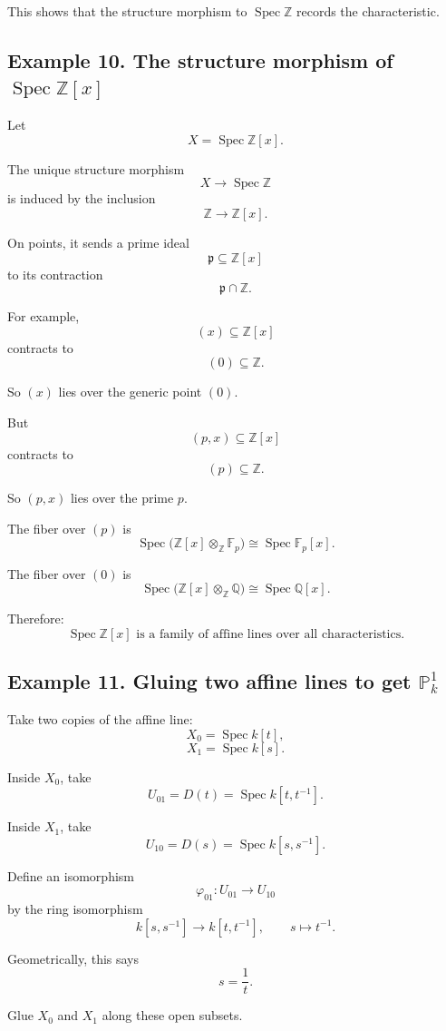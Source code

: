 \documentclass[12pt,a4paper]{article}
\newcommand{\Spec}{\operatorname{Spec}}
\theoremstyle{notespace}
\begin{document}
This shows that the structure morphism to \(\Spec\mathbb Z\) records the characteristic.

\subsection{Example 10. The structure morphism of \(\Spec\mathbb Z[x]\)}

Let
\[
X=\Spec\mathbb Z[x].
\]

The unique structure morphism
\[
X\to\Spec\mathbb Z
\]
is induced by the inclusion
\[
\mathbb Z\to\mathbb Z[x].
\]

On points, it sends a prime ideal
\[
\mathfrak p\subseteq\mathbb Z[x]
\]
to its contraction
\[
\mathfrak p\cap\mathbb Z.
\]

For example,
\[
(x)\subseteq\mathbb Z[x]
\]
contracts to
\[
(0)\subseteq\mathbb Z.
\]

So \((x)\) lies over the generic point \((0)\).

But
\[
(p,x)\subseteq\mathbb Z[x]
\]
contracts to
\[
(p)\subseteq\mathbb Z.
\]

So \((p,x)\) lies over the prime \(p\).

The fiber over \((p)\) is
\[
\Spec\bigl(\mathbb Z[x]\otimes_{\mathbb Z}\mathbb F_p\bigr)
\cong
\Spec\mathbb F_p[x].
\]

The fiber over \((0)\) is
\[
\Spec\bigl(\mathbb Z[x]\otimes_{\mathbb Z}\mathbb Q\bigr)
\cong
\Spec\mathbb Q[x].
\]

Therefore:
\[
\boxed{
	\Spec\mathbb Z[x]
	\text{ is a family of affine lines over all characteristics.}
}
\]

\subsection{Example 11. Gluing two affine lines to get \(\mathbb P^1_k\)}

Take two copies of the affine line:
\[
X_0=\Spec k[t],
\]
\[
X_1=\Spec k[s].
\]

Inside \(X_0\), take
\[
U_{01}=D(t)=\Spec k[t,t^{-1}].
\]

Inside \(X_1\), take
\[
U_{10}=D(s)=\Spec k[s,s^{-1}].
\]

Define an isomorphism
\[
\varphi_{01}:U_{01}\to U_{10}
\]
by the ring isomorphism
\[
k[s,s^{-1}]
\to
k[t,t^{-1}],
\qquad
s\mapsto t^{-1}.
\]

Geometrically, this says
\[
s=\frac1t.
\]

Glue \(X_0\) and \(X_1\) along these open subsets.
\end{document}
